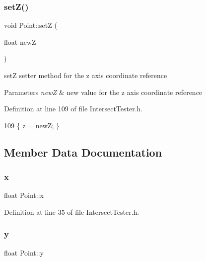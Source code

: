 \subsubsection{\texorpdfstring{set\+Z()}{setZ()}}
{\footnotesize\ttfamily void Point\+::setZ (\begin{DoxyParamCaption}\item[{float}]{newZ }\end{DoxyParamCaption})\hspace{0.3cm}{\ttfamily [inline]}}



setZ setter method for the z axis coordinate reference 


\begin{DoxyParams}{Parameters}
{\em newZ} & new value for the z axis coordinate reference \\
\hline
\end{DoxyParams}


Definition at line 109 of file Intersect\+Tester.\+h.


\begin{DoxyCode}
109 \{ \hyperlink{class_point_a9a666531e0e99adff132be93d2407d0c}{z} = newZ; \}
\end{DoxyCode}


\subsection{Member Data Documentation}
\mbox{\label{class_point_a05dfe2dfbde813ad234b514f30e662f1}} 
\subsubsection{\texorpdfstring{x}{x}}
{\footnotesize\ttfamily float Point\+::x}



Definition at line 35 of file Intersect\+Tester.\+h.

\mbox{\label{class_point_a6101960c8d2d4e8ea1d32c9234bbeb8d}} 
\subsubsection{\texorpdfstring{y}{y}}
{\footnotesize\ttfamily float Point\+::y}



